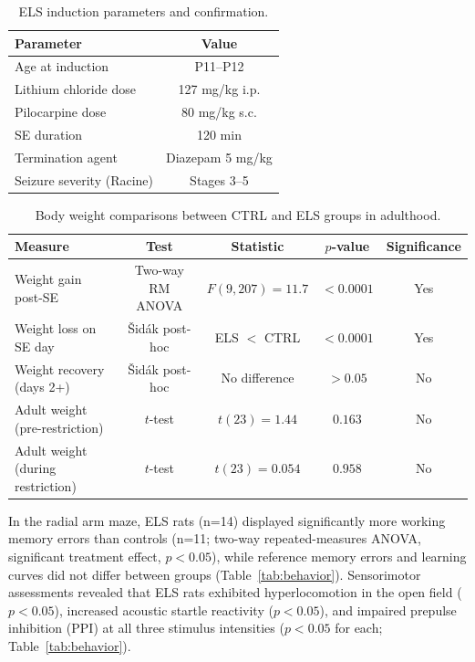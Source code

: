 \documentclass[11pt]{article}
\begin{document}
\begin{table}[H]
\centering
\caption{ELS induction parameters and confirmation.}
\label{tab:induction}
\begin{tabular}{lc}
\toprule
\textbf{Parameter} & \textbf{Value} \\
\midrule
Age at induction & P11--P12 \\
Lithium chloride dose & 127 mg/kg i.p. \\
Pilocarpine dose & 80 mg/kg s.c. \\
SE duration & 120 min \\
Termination agent & Diazepam 5 mg/kg \\
Seizure severity (Racine) & Stages 3--5 \\
\bottomrule
\end{tabular}
\end{table}

\begin{table}[H]
\centering
\caption{Body weight comparisons between CTRL and ELS groups in adulthood.}
\label{tab:weight}
\begin{tabular}{lcccc}
\toprule
\textbf{Measure} & \textbf{Test} & \textbf{Statistic} & \textbf{$p$-value} & \textbf{Significance} \\
\midrule
Weight gain post-SE & Two-way RM ANOVA & $F(9,207)=11.7$ & $<0.0001$ & Yes \\
Weight loss on SE day & \v{S}id\'{a}k post-hoc & ELS $<$ CTRL & $<0.0001$ & Yes \\
Weight recovery (days 2+) & \v{S}id\'{a}k post-hoc & No difference & $>0.05$ & No \\
Adult weight (pre-restriction) & $t$-test & $t(23)=1.44$ & $0.163$ & No \\
Adult weight (during restriction) & $t$-test & $t(23)=0.054$ & $0.958$ & No \\
\bottomrule
\end{tabular}
\end{table}

In the radial arm maze, ELS rats (n=14) displayed significantly more working memory errors than controls (n=11; two-way repeated-measures ANOVA, significant treatment effect, $p<0.05$), while reference memory errors and learning curves did not differ between groups (Table~\ref{tab:behavior}). Sensorimotor assessments revealed that ELS rats exhibited hyperlocomotion in the open field ($p<0.05$), increased acoustic startle reactivity ($p<0.05$), and impaired prepulse inhibition (PPI) at all three stimulus intensities ($p<0.05$ for each; Table~\ref{tab:behavior}).
\end{document}
